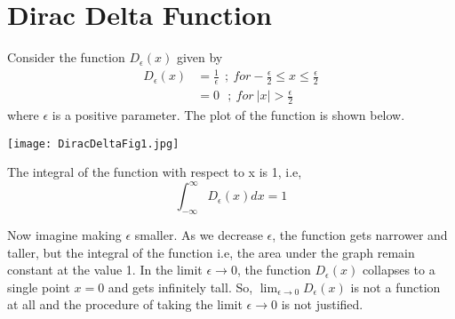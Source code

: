 

%        
%        
%
%
%
%
%



\section{Dirac Delta Function}
Consider the function $D_\epsilon (x)$ given by 
\begin{align*}
D_\epsilon (x) & = \frac{1}{\epsilon} \ \ ;\ for -\frac{\epsilon}{2} \leq x \leq \frac{\epsilon}{2} \\
& = 0 \ \ \ ;\ for \ |x| > \frac{\epsilon}{2}
\end{align*}
where $\epsilon$ is a positive parameter. The plot of the function is shown below.

\begin{center}
\texttt{[image: DiracDeltaFig1.jpg]}
\end{center}

The integral of the function with respect to x is 1, i.e,
\begin{equation}
\int_{-\infty}^\infty D_\epsilon (x) dx = 1 
\end{equation}

Now imagine making $\epsilon$ smaller. As we decrease $\epsilon$, the function gets narrower and taller, but the integral of the function i.e, the area under the graph remain constant at the value 1. In the limit $\epsilon \to 0$, the function $D_{\epsilon} (x)$ collapses to a single point $x=0$ and gets infinitely tall. So, $\lim_{\epsilon \to 0} D_\epsilon (x)$ is not a function at all and the procedure of taking the limit $\epsilon \to 0$ is not justified.

